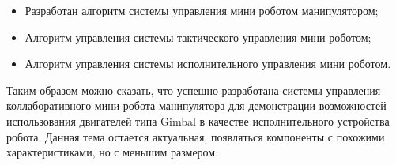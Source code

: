 \begin{itemize}
    \item Разработан алгоритм системы управления мини роботом манипулятором;
    \item Алгоритм управления системы тактического управления мини роботом;
    \item Алгоритм управления системы исполнительного управления мини роботом.
\end{itemize}
Таким образом можно сказать, что успешно разработана системы управления коллаборативного мини робота манипулятора для демонстрации возможностей использования двигателей типа Gimbal в качестве исполнительного устройства робота. Данная тема остается актуальная, появляться компоненты с похожими характеристиками, но с меньшим размером.